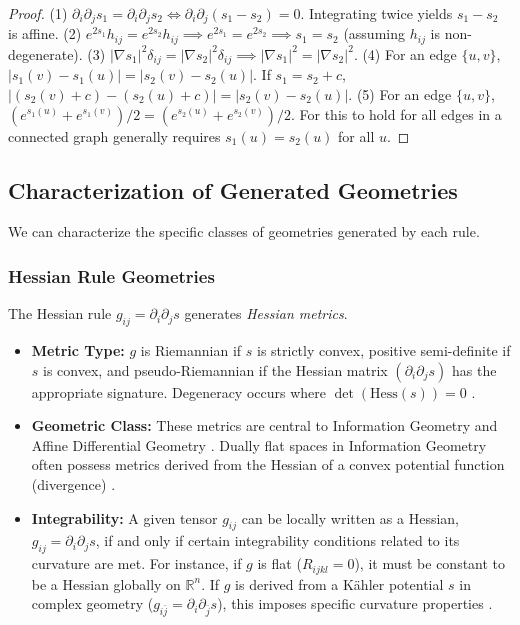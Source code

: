 \documentclass[twoside,twocolumn]{article}
\numberwithin{equation}{section} %
\begin{document}
\begin{proof} %
(1) \( \partial_i \partial_j s_1 = \partial_i \partial_j s_2 \iff \partial_i \partial_j (s_1 - s_2) = 0 \). Integrating twice yields \( s_1-s_2 \) is affine.
(2) \( e^{2s_1} h_{ij} = e^{2s_2} h_{ij} \implies e^{2s_1}=e^{2s_2} \implies s_1=s_2 \) (assuming \( h_{ij} \) is non-degenerate).
(3) \( |\nabla s_1|^2 \delta_{ij} = |\nabla s_2|^2 \delta_{ij} \implies |\nabla s_1|^2 = |\nabla s_2|^2 \).
(4) For an edge \( \{u, v\} \), \( |s_1(v)-s_1(u)| = |s_2(v)-s_2(u)| \). If \( s_1 = s_2 + c \), \( |(s_2(v)+c)-(s_2(u)+c)| = |s_2(v)-s_2(u)| \).
(5) For an edge \( \{u, v\} \), \( (e^{s_1(u)}+e^{s_1(v)})/2 = (e^{s_2(u)}+e^{s_2(v)})/2 \). For this to hold for all edges in a connected graph generally requires \( s_1(u) = s_2(u) \) for all \( u \).
\end{proof}

\subsection{Characterization of Generated Geometries}

We can characterize the specific classes of geometries generated by each rule.

\subsubsection{Hessian Rule Geometries}
The Hessian rule \( g_{ij} = \partial_i \partial_j s \) generates \emph{Hessian metrics}.
\begin{itemize}
    \item \textbf{Metric Type:} \( g \) is Riemannian if \( s \) is strictly convex, positive semi-definite if \( s \) is convex, and pseudo-Riemannian if the Hessian matrix \( (\partial_i \partial_j s) \) has the appropriate signature. Degeneracy occurs where \( \det(\text{Hess}(s)) = 0 \) \cite{Rockafellar1970}. %
    \item \textbf{Geometric Class:} These metrics are central to Information Geometry and Affine Differential Geometry \cite{Amari2016,Shima2007}. %
    Dually flat spaces in Information Geometry often possess metrics derived from the Hessian of a convex potential function (divergence) \cite{Amari2016}. %
    \item \textbf{Integrability:} A given tensor \( g_{ij} \) can be locally written as a Hessian, \( g_{ij}=\partial_i\partial_j s \), if and only if certain integrability conditions related to its curvature are met. For instance, if \( g \) is flat (\( R_{ijkl}=0 \)), it must be constant to be a Hessian globally on \( \mathbb{R}^n \). If \( g \) is derived from a K\"ahler potential \( s \) in complex geometry (\( g_{i\bar{j}} = \partial_i \partial_{\bar{j}} s \)), this imposes specific curvature properties \cite{Jost2017}. %
\end{itemize}
\end{document}
